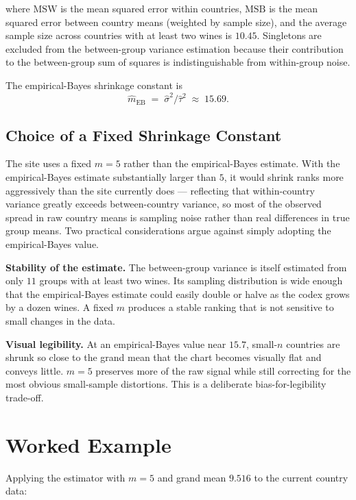 \documentclass[11pt]{article}
\begin{document}
where $\mathrm{MSW}$ is the mean squared error within countries,
$\mathrm{MSB}$ is the mean squared error between country means (weighted
by sample size), and the average sample size across countries with at
least two wines is $10.45$. Singletons are excluded from the
between-group variance estimation because their contribution to the
between-group sum of squares is indistinguishable from within-group
noise.

The empirical-Bayes shrinkage constant is
\[
    \hat{m}_{\text{EB}} \;=\; \hat{\sigma}^2 / \hat{\tau}^2 \;\approx\; 15.69.
\]

\subsection{Choice of a Fixed Shrinkage Constant}

The site uses a fixed $m = 5$ rather than the empirical-Bayes estimate.
With the empirical-Bayes estimate substantially larger than $5$, it
would shrink ranks more aggressively than the site currently does ---
reflecting that within-country variance greatly exceeds between-country
variance, so most of the observed spread in raw country means is
sampling noise rather than real differences in true group means. Two
practical considerations argue against simply adopting the
empirical-Bayes value.

\textbf{Stability of the estimate.} The between-group variance is itself
estimated from only $11$ groups with at least two wines. Its sampling
distribution is wide enough that the empirical-Bayes estimate could
easily double or halve as the codex grows by a dozen wines. A fixed $m$
produces a stable ranking that is not sensitive to small changes in the
data.

\textbf{Visual legibility.} At an empirical-Bayes value near $15.7$,
small-$n$ countries are shrunk so close to the grand mean that the
chart becomes visually flat and conveys little. $m = 5$ preserves more
of the raw signal while still correcting for the most obvious
small-sample distortions. This is a deliberate bias-for-legibility
trade-off.

\section{Worked Example}

Applying the estimator with $m = 5$ and grand mean $9.516$ to the
current country data:
\end{document}
